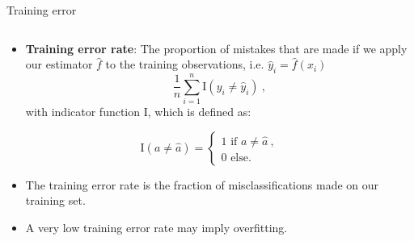 \documentclass[10pt,ignorenonframetext,]{beamer}
\providecommand{\tightlist}{%
  \setlength{\itemsep}{0pt}\setlength{\parskip}{0pt}}
\begin{document}
\begin{frame}

\begin{block}{Training error}

\(~\)

\begin{itemize}
\tightlist
\item
  \textbf{Training error rate}: The proportion of mistakes that are made
  if we apply our estimator \(\hat{f}\) to the training observations,
  i.e. \(\hat{y}_i=\hat{f}(x_i)\)
  \[\frac{1}{n}\sum_{i=1}^n \text{I}(y_i \neq \hat{y}_i) \ ,\] with
  indicator function I, which is defined as:
\end{itemize}

\[\text{I}(a\neq\hat{a}) = \begin{cases} 1 \text{ if } a \neq \hat{a} \ , \\ 
0 \text{ else. } \end{cases}\]

\vspace{2mm}

\begin{itemize}
\tightlist
\item
  The training error rate is the fraction of misclassifications made on
  our training set.
\end{itemize}

\vspace{2mm}

\begin{itemize}
\tightlist
\item
  A very low training error rate may imply overfitting.
\end{itemize}

\end{block}

\end{frame}
\end{document}
